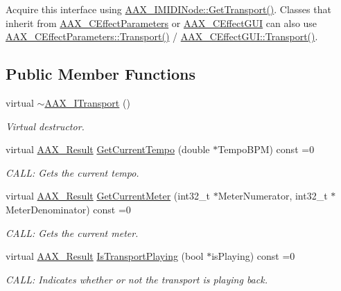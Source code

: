 Acquire this interface using \hyperlink{a00105_a57bd132ee74047e25298b157c0bff2f9}{A\+A\+X\+\_\+\+I\+M\+I\+D\+I\+Node\+::\+Get\+Transport()}. Classes that inherit from \hyperlink{a00018}{A\+A\+X\+\_\+\+C\+Effect\+Parameters} or \hyperlink{a00017}{A\+A\+X\+\_\+\+C\+Effect\+G\+U\+I} can also use \hyperlink{a00018_af003e341f47eb1f170529db63066eca3}{A\+A\+X\+\_\+\+C\+Effect\+Parameters\+::\+Transport()} / \hyperlink{a00017_a5a034e713b03fb4591e45c2e7167189d}{A\+A\+X\+\_\+\+C\+Effect\+G\+U\+I\+::\+Transport()}. \subsection*{Public Member Functions}
\begin{DoxyCompactItemize}
\item 
virtual \hyperlink{a00116_a12f99a509f2a4b5e3ca0bfe9f850d0a9}{$\sim$\+A\+A\+X\+\_\+\+I\+Transport} ()
\begin{DoxyCompactList}\small\item\em Virtual destructor. \end{DoxyCompactList}\item 
virtual \hyperlink{a00149_a4d8f69a697df7f70c3a8e9b8ee130d2f}{A\+A\+X\+\_\+\+Result} \hyperlink{a00116_a006d7fdcc06c2c94209eeed846dfc068}{Get\+Current\+Tempo} (double $\ast$Tempo\+B\+P\+M) const =0
\begin{DoxyCompactList}\small\item\em C\+A\+L\+L\+: Gets the current tempo. \end{DoxyCompactList}\item 
virtual \hyperlink{a00149_a4d8f69a697df7f70c3a8e9b8ee130d2f}{A\+A\+X\+\_\+\+Result} \hyperlink{a00116_a211da0df922d70a9f5b85e7d596cc938}{Get\+Current\+Meter} (int32\+\_\+t $\ast$Meter\+Numerator, int32\+\_\+t $\ast$Meter\+Denominator) const =0
\begin{DoxyCompactList}\small\item\em C\+A\+L\+L\+: Gets the current meter. \end{DoxyCompactList}\item 
virtual \hyperlink{a00149_a4d8f69a697df7f70c3a8e9b8ee130d2f}{A\+A\+X\+\_\+\+Result} \hyperlink{a00116_a8f7d5b8f65ff9dd456a395838c974715}{Is\+Transport\+Playing} (bool $\ast$is\+Playing) const =0
\begin{DoxyCompactList}\small\item\em C\+A\+L\+L\+: Indicates whether or not the transport is playing back. \end{DoxyCompactList}\item 

\end{DoxyCompactItemize}
